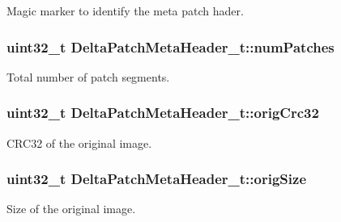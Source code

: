 Magic marker to identify the meta patch hader. 

\subsubsection[{\texorpdfstring{num\+Patches}{numPatches}}]{\setlength{\rightskip}{0pt plus 5cm}uint32\+\_\+t Delta\+Patch\+Meta\+Header\+\_\+t\+::num\+Patches}\hypertarget{struct_delta_patch_meta_header__t_a0a4ff5a208c59f0d71f6b4867d7b01e5}{}\label{struct_delta_patch_meta_header__t_a0a4ff5a208c59f0d71f6b4867d7b01e5}


Total number of patch segments. 

\subsubsection[{\texorpdfstring{orig\+Crc32}{origCrc32}}]{\setlength{\rightskip}{0pt plus 5cm}uint32\+\_\+t Delta\+Patch\+Meta\+Header\+\_\+t\+::orig\+Crc32}\hypertarget{struct_delta_patch_meta_header__t_ac7869da2c1746db8e18c13073994586e}{}\label{struct_delta_patch_meta_header__t_ac7869da2c1746db8e18c13073994586e}


C\+R\+C32 of the original image. 

\subsubsection[{\texorpdfstring{orig\+Size}{origSize}}]{\setlength{\rightskip}{0pt plus 5cm}uint32\+\_\+t Delta\+Patch\+Meta\+Header\+\_\+t\+::orig\+Size}\hypertarget{struct_delta_patch_meta_header__t_a7fc9388882cef84bf866ad7eb6bd1a41}{}\label{struct_delta_patch_meta_header__t_a7fc9388882cef84bf866ad7eb6bd1a41}


Size of the original image. 

